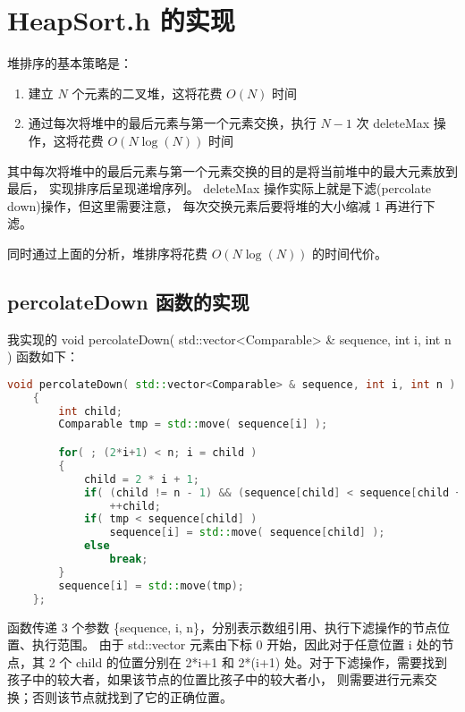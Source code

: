 \documentclass[UTF8]{ctexart}
\begin{document}
\pagestyle{fancy}
\fancyhead{}

\section{HeapSort.h 的实现}
堆排序的基本策略是：
\begin{enumerate}[(1)]
    \item 建立 $N$ 个元素的二叉堆，这将花费 $O(N)$ 时间
    \item 通过每次将堆中的最后元素与第一个元素交换，执行 $N-1$ 次 deleteMax 操作，这将花费 $O(N\log(N))$ 时间
\end{enumerate}

其中每次将堆中的最后元素与第一个元素交换的目的是将当前堆中的最大元素放到最后，
实现排序后呈现递增序列。 deleteMax 操作实际上就是下滤(percolate down)操作，但这里需要注意，
每次交换元素后要将堆的大小缩减 1 再进行下滤。

同时通过上面的分析，堆排序将花费 $O(N\log(N))$ 的时间代价。

\subsection{percolateDown 函数的实现}
我实现的 void percolateDown( std::vector<Comparable> \& sequence, int i, int n ) 函数如下：
\begin{lstlisting}[language=c++, breaklines=true, keywordstyle=\color{blue!70}, commentstyle=\color{red!50!green!50!blue!50}, frame=shadowbox, rulesepcolor=\color{red!20!green!20!blue!20}]
    void percolateDown( std::vector<Comparable> & sequence, int i, int n )
    {
        int child;
        Comparable tmp = std::move( sequence[i] );

        for( ; (2*i+1) < n; i = child )
        {
            child = 2 * i + 1;
            if( (child != n - 1) && (sequence[child] < sequence[child + 1]))
                ++child;
            if( tmp < sequence[child] )
                sequence[i] = std::move( sequence[child] );
            else
                break;
        }
        sequence[i] = std::move(tmp);
    }; 
\end{lstlisting}

函数传递 3 个参数 \{sequence, i, n\}，分别表示数组引用、执行下滤操作的节点位置、执行范围。
由于 std::vector 元素由下标 0 开始，因此对于任意位置 i 处的节点，其 2 个 child 的位置分别在
 2*i+1 和 2*(i+1) 处。对于下滤操作，需要找到孩子中的较大者，如果该节点的位置比孩子中的较大者小，
则需要进行元素交换；否则该节点就找到了它的正确位置。
\end{document}

